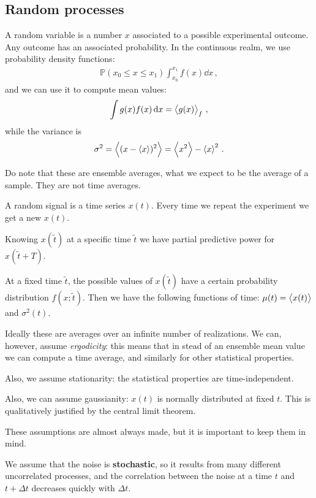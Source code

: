 \documentclass[main.tex]{subfiles}
\begin{document}
\subsection{Random processes}

A random variable is a number \(x\) associated to a possible experimental outcome. Any outcome has an associated probability.
In the continuous realm, we use probability density functions: 
%
\begin{align}
\mathbb{P} (x_0 \leq x \leq x_1 ) \int_{x_0 }^{x_1 } f(x) \dd{x}
\,,
\end{align}
%
and we can use it to compute mean values: 
%
\begin{align}
\int g(x) f(x) \dd{x} = \expval{g(x)}_{f}
\,,
\end{align}
%
while the variance is 
%
\begin{align}
\sigma^2  = \expval{(x - \expval{x})^2} = \expval{x^2} - \expval{x}^2
\,.
\end{align}

Do note that these are ensemble averages, what we expect to be the average of a sample. They are not time averages. 

A random signal is a time series \(x(t)\).
Every time we repeat the experiment we get a new \(x(t)\). 

Knowing \(x(\widetilde{t})\) at a specific time \(\widetilde{t}\) we have partial predictive power for \(x(\widetilde{t} + T)\). 

At a fixed time \(\widetilde{t}\), the possible values of \(x(\widetilde{t})\) have a certain probability distribution \(f(x; \widetilde{t})\). Then we have the following functions of time: \(\mu (t) = \expval{x(t)}\) and \(\sigma^2(t)\). 

Ideally these are averages over an infinite number of realizations. We can, however, assume \emph{ergodicity}: this means that in stead of an ensemble mean value we can compute a time average, and similarly for other statistical properties. 

Also, we assume stationarity: the statistical properties are time-independent. 

Also, we can assume gaussianity: \(x(t)\) is normally distributed at fixed \(t\). 
This is qualitatively justified by the central limit theorem. 

These assumptions are almost always made, but it is important to keep them in mind.

We assume that the noise is \textbf{stochastic}, so it results from many different uncorrelated processes, and the correlation between the noise at a time \(t\) and \(t + \Delta t\) decreases quickly with \(\Delta t\). 
\end{document}
